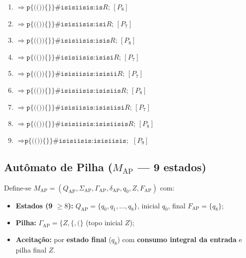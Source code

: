 {\begin{enumerate}[leftmargin=1.7em, itemsep=0.5pt, topsep=2pt]
    \item $\Rightarrow \texttt{p\{(())\{\}\}\#isisiisis:is}R\texttt{;}$ \hfill $[P_8]$
    \item $\Rightarrow \texttt{p\{(())\{\}\}\#isisiisis:isi}R\texttt{;}$ \hfill $[P_7]$
    \item $\Rightarrow \texttt{p\{(())\{\}\}\#isisiisis:isis}R\texttt{;}$ \hfill $[P_8]$
    \item $\Rightarrow \texttt{p\{(())\{\}\}\#isisiisis:isisi}R\texttt{;}$ \hfill $[P_7]$
    \item $\Rightarrow \texttt{p\{(())\{\}\}\#isisiisis:isisii}R\texttt{;}$ \hfill $[P_7]$
    \item $\Rightarrow \texttt{p\{(())\{\}\}\#isisiisis:isisiis}R\texttt{;}$ \hfill $[P_8]$
    \item $\Rightarrow \texttt{p\{(())\{\}\}\#isisiisis:isisiisi}R\texttt{;}$ \hfill $[P_7]$
    \item $\Rightarrow \texttt{p\{(())\{\}\}\#isisiisis:isisiisis}R\texttt{;}$ \hfill $[P_8]$
    \item $\Rightarrow \texttt{p\{(())\{\}\}\#isisiisis:isisiisis;}$ \hfill $[P_9]$
\end{enumerate}}

\subsection{Autômato de Pilha ($M_{\text{AP}}$ --- 9 estados)}

Define-se $M_{\text{AP}} = (Q_{\text{AP}}, \Sigma_{\text{AP}}, \Gamma_{\text{AP}}, \delta_{\text{AP}}, q_0, Z, F_{\text{AP}})$ com:
\begin{itemize}
    \item \textbf{Estados (9 $\ge 8$):} $Q_{\text{AP}} = \{q_0, q_1, \dots, q_8\}$, inicial $q_0$, final $F_{\text{AP}} = \{q_8\}$;
    \item \textbf{Pilha:} $\Gamma_{\text{AP}} = \{Z, \texttt{\{}, \texttt{(}\}$ (topo inicial $Z$);
    \item \textbf{Aceitação:} por \textbf{estado final} ($q_8$) com \textbf{consumo integral da entrada} e pilha final $Z$.
\end{itemize}

